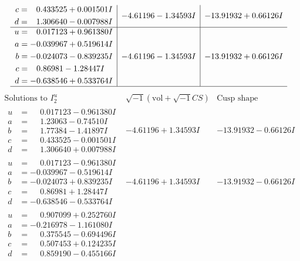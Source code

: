 \documentclass[1p]{elsarticle_modified}
\theoremstyle{definition}
\newcommand{\I}{\sqrt{-1}}
\begin{document}
$$\begin{array}{c|c|c}
\begin{aligned}
c &= \phantom{-}0.433525 + 0.001501 I \\
d &= \phantom{-}1.306640 - 0.007988 I\end{aligned}
 & -4.61196 - 1.34593 I & -13.91932 + 0.66126 I \\ \hline\begin{aligned}
u &= \phantom{-}0.017123 + 0.961380 I \\
a &= -0.039967 + 0.519614 I \\
b &= -0.024073 - 0.839235 I \\
c &= \phantom{-}0.86981 - 1.28447 I \\
d &= -0.638546 + 0.533764 I\end{aligned}
 & -4.61196 - 1.34593 I & -13.91932 + 0.66126 I\\
 \hline 
 \end{array}$$\newpage$$\begin{array}{c|c|c}  
\text{Solutions to }I^u_{2}& \I (\text{vol} + \sqrt{-1}CS) & \text{Cusp shape}\\
 \hline 
\begin{aligned}
u &= \phantom{-}0.017123 - 0.961380 I \\
a &= \phantom{-}1.23063 - 0.74510 I \\
b &= \phantom{-}1.77384 - 1.41897 I \\
c &= \phantom{-}0.433525 - 0.001501 I \\
d &= \phantom{-}1.306640 + 0.007988 I\end{aligned}
 & -4.61196 + 1.34593 I & -13.91932 - 0.66126 I \\ \hline\begin{aligned}
u &= \phantom{-}0.017123 - 0.961380 I \\
a &= -0.039967 - 0.519614 I \\
b &= -0.024073 + 0.839235 I \\
c &= \phantom{-}0.86981 + 1.28447 I \\
d &= -0.638546 - 0.533764 I\end{aligned}
 & -4.61196 + 1.34593 I & -13.91932 - 0.66126 I \\ \hline\begin{aligned}
u &= \phantom{-}0.907099 + 0.252760 I \\
a &= -0.216978 - 1.161080 I \\
b &= \phantom{-}0.375545 - 0.694496 I \\
c &= \phantom{-}0.507453 + 0.124235 I \\
d &= \phantom{-}0.859190 - 0.455166 I\end{aligned}

\end{array}$$
\end{document}
